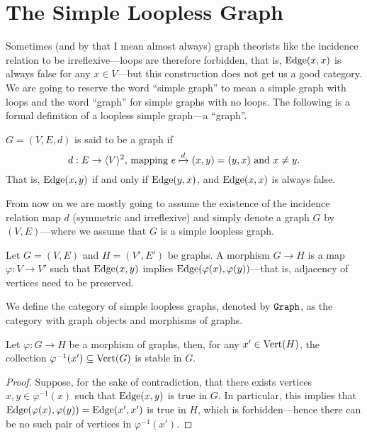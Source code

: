 \section{The Simple Loopless Graph}

Sometimes (and by that I mean almost always) graph theorists like the incidence
relation to be irreflexive---loops are therefore forbidden, that is,
\(\operatorname{Edge}(x, x)\) is always false for any \(x \in V\)---but this construction does
not get us a good category. We are going to reserve the word ``simple graph'' to
mean a simple graph with loops and the word ``graph'' for simple graphs with no
loops. The following is a formal definition of a loopless simple graph---a
``graph''.

\begin{definition}[Graph]\label{def: graph}
\(G = (V, E, d)\) is said to be a graph if
\[
  d: E \to \langle V \rangle^2 \text{, mapping } e \xmapsto d (x, y) = (y, x)
  \text{ and } x \neq y.
\]
That is, \(\operatorname{Edge}(x, y)\) if and only if \(\operatorname{Edge}(y, x)\), and \(\operatorname{Edge}(x, x)\) is
always false.
\end{definition}

From now on we are mostly going to assume the existence of the incidence
relation map \(d\) (symmetric and irreflexive) and simply denote a graph \(G\)
by \((V, E)\)---where we assume that \(G\) is a simple loopless graph.

\begin{definition}\label{def: graph-morph}
Let \(G = (V, E)\) and \(H = (V', E')\) be graphs. A morphism \(G \to H\) is a
map \(\varphi: V \to V'\) such that \(\operatorname{Edge}(x, y)\) implies
\(\operatorname{Edge}(\varphi(x), \varphi(y))\)---that is, adjacency of vertices need to be
preserved.
\end{definition}

\begin{definition}\label{def: graph-cat}
We define the category of simple loopless graphs, denoted by \({\texttt{Graph}}\), as
the category with graph objects and morphisms of graphs.
\end{definition}

\begin{lemma}\label{lem: stable-preimage}
Let \(\varphi: G \to H\) be a morphism of graphs, then, for any \(x' \in
\operatorname{Vert}(H)\), the collection \(\varphi^{-1}(x') \subseteq \operatorname{Vert}(G)\) is stable in \(G\).
\end{lemma}

\begin{proof}
Suppose, for the sake of contradiction, that there exists vertices \(x, y \in
\varphi^{-1}(x)\) such that \(\operatorname{Edge}(x, y)\) is true in \(G\). In particular, this
implies that \(\operatorname{Edge}(\varphi(x), \varphi(y)) = \operatorname{Edge}(x', x')\) is true in \(H\), which
is forbidden---hence there can be no such pair of vertices in
\(\varphi^{-1}(x')\).
\end{proof}

